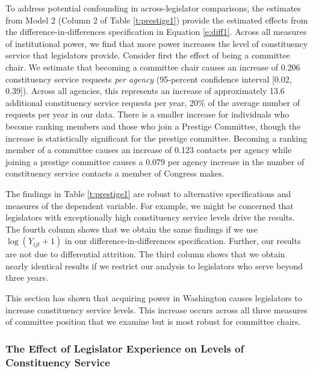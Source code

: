 \documentclass[12pt]{article}
\begin{document}
To address potential confounding in across-legislator comparisons, the estimates from Model 2 (Column 2 of Table \ref{t:prestige1}) provide the estimated effects from the difference-in-differences specification in Equation \ref{e:diff1}. Across all measures of institutional power, we find that more power increases the level of constituency service that legislators provide. Consider first the effect of being a committee chair. We estimate that becoming a committee chair causes an increase of 0.206 constituency service requests \textit{per agency} (95-percent confidence interval [0.02, 0.39]). Across all agencies, this represents an increase of approximately 13.6 additional constituency service requests per year, 20\% of the average number of requests per year in our data. There is a smaller increase for individuals who become ranking members and those who join a Prestige Committee, though the increase is statistically significant for the prestige committee. Becoming a ranking member of a committee causes an increase of 0.123 contacts per agency while joining a prestige committee causes a 0.079 per agency increase in the number of constituency service contacts a member of Congress makes.

The findings in Table \ref{t:prestige1} are robust to alternative specifications and measures of the dependent variable. For example, we might be concerned that legislators with exceptionally high constituency service levels drive the results. The fourth column shows that we obtain the same findings if we use $\log (Y_{ijt} + 1)$ in our difference-in-differences specification. Further, our results are not due to differential attrition. The third column shows that we obtain nearly identical results if we restrict our analysis to legislators who serve beyond three years.    

This section has shown that acquiring power in Washington causes legislators to increase constituency service levels. This increase occurs across all three measures of committee position that we examine but is most robust for committee chairs. 


\subsubsection{The Effect of Legislator Experience on Levels of Constituency Service}\label{s:tenure} 
\end{document}
